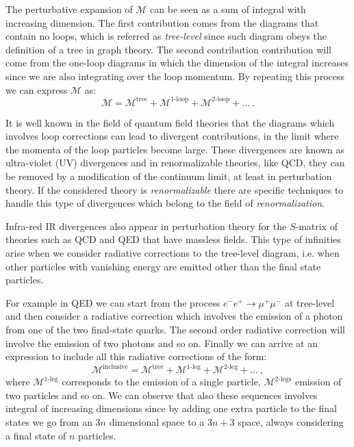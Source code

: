 \documentclass[../main/main.tex]{subfiles}
\begin{document}
The perturbative expansion of $\mathcal{M}$ can be seen as a sum of integral with increasing dimension. The first contribution comes 
from the diagrams that contain no loops, which is referred as \emph{tree-level} since such diagram obeys the definition of a tree in graph
theory. The second contribution contribution will come from the one-loop diagrams in which the dimension of the integral increases 
since we are also integrating over the loop momentum. By repeating this process we can express $\mathcal{M}$ as:
\begin{equation}
	\mathcal{M}=\mathcal{M}^{\text{tree}} + \mathcal{M}^{\text{1-loop}} + \mathcal{M}^{\text{2-loop}} + \dots \ .
\end{equation}

It is well known in the field of quantum field theories that the diagrams which involves loop corrections can lead to divergent contributions, in the limit where the momenta of the loop particles become large. These divergences are known as ultra-violet (UV) divergences and in renormalizable theories, like QCD, they can be removed by a modification of the continuum limit, at least in perturbation theory.
If the considered theory is \emph{renormalizable} there are specific techniques to handle this type of divergences which belong to the 
field of \emph{renormalization}.

Infra-red IR divergences also appear in perturbation theory for the $S$-matrix of theories such as QCD and QED that have massless fields.
This type of infinities arise when we consider radiative corrections to the tree-level diagram, i.e. when other particles with vanishing energy are emitted other than the final state particles.

For example in QED we can start from the process $e^- e^+ \to \mu^+ \mu^-$ at tree-level and then consider a radiative correction which 
involves the emission of a photon from one of the two final-state quarks. The second order radiative correction will involve the emission of 
two photons and so on. Finally we can arrive at an expression to include all this radiative corrections of the form:
\begin{equation}
	\mathcal{M}^{\text{inclusive}} = \mathcal{M}^{\text{tree}} + \mathcal{M}^{\text{1-leg}} + \mathcal{M}^{\text{2-leg}} + \dots \ ,
\end{equation}
where $\mathcal{M}^{\text{1-leg}}$ corresponds to the emission of a single particle,  $\mathcal{M}^{\text{2-legs}}$ emission of two
particles and so on.
We can observe that also these sequences involves integral of increasing dimensions since by adding one extra particle to the final states 
we go from an $3n$ dimensional space to a $3n + 3$ space, always considering a final state of $n$ particles.
\end{document}
